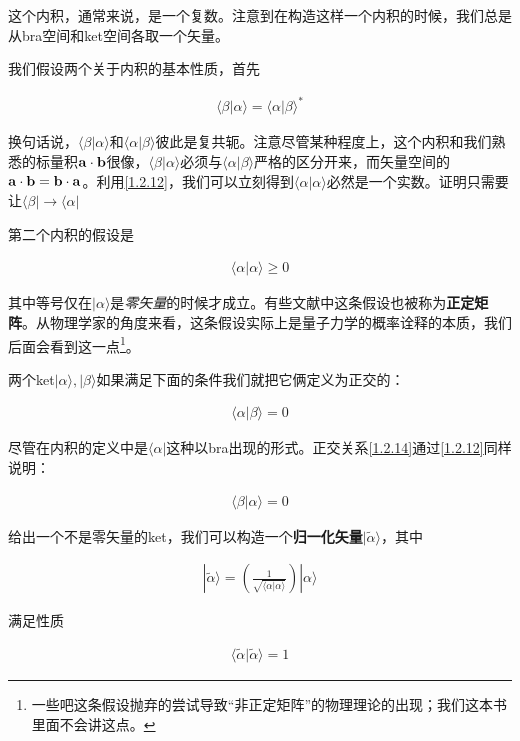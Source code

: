\documentclass[UTF8,twoside]{ctexart}
\begin{document}
这个内积，通常来说，是一个复数。注意到在构造这样一个内积的时候，我们总是从bra空间和ket空间各取一个矢量。

我们假设两个关于内积的基本性质，首先

\begin{align}\label{1.2.12}
\langle\beta|\alpha\rangle = \langle\alpha|\beta\rangle^*
\end{align}

\noindent 换句话说，$\langle\beta|\alpha\rangle$和$\langle\alpha|\beta\rangle$彼此是复共轭。注意尽管某种程度上，这个内积和我们熟悉的标量积$\bf a\cdot b$很像，$\langle\beta|\alpha\rangle$必须与$\langle\alpha|\beta\rangle$严格的区分开来，而矢量空间的$\bf a\cdot b = b\cdot a$。利用\eqref{1.2.12}，我们可以立刻得到$\langle\alpha|\alpha\rangle$必然是一个实数。证明只需要让$\langle\beta|\to\langle\alpha|$

第二个内积的假设是

\begin{align}
\langle\alpha|\alpha\rangle\ge0
\end{align}

\noindent 其中等号仅在$|\alpha\rangle$是{\emph{零矢量}}的时候才成立。有些文献中这条假设也被称为{\bf{正定矩阵}}。从物理学家的角度来看，这条假设实际上是量子力学的概率诠释的本质，我们后面会看到这一点\footnote{一些吧这条假设抛弃的尝试导致``非正定矩阵''的物理理论的出现；我们这本书里面不会讲这点。}。

两个ket$|\alpha\rangle,|\beta\rangle$如果满足下面的条件我们就把它俩定义为正交的：

\begin{align}\label{1.2.14}
\langle\alpha|\beta\rangle = 0
\end{align}

\noindent 尽管在内积的定义中是$\langle\alpha|$这种以bra出现的形式。正交关系\eqref{1.2.14}通过\eqref{1.2.12}同样说明：

\begin{align}
\langle\beta|\alpha\rangle = 0
\end{align}

给出一个不是零矢量的ket，我们可以构造一个{\bf 归一化矢量}$|\tilde{\alpha}\rangle$，其中

\begin{align}
|\tilde{\alpha}\rangle = \left(\frac{1}{\sqrt{\langle\alpha|\alpha\rangle}}\right)|\alpha\rangle
\end{align}

\noindent 满足性质

\begin{align}\label{1.2.17}
\langle\tilde{\alpha}|\tilde{\alpha}\rangle = 1
\end{align}
\end{document}
